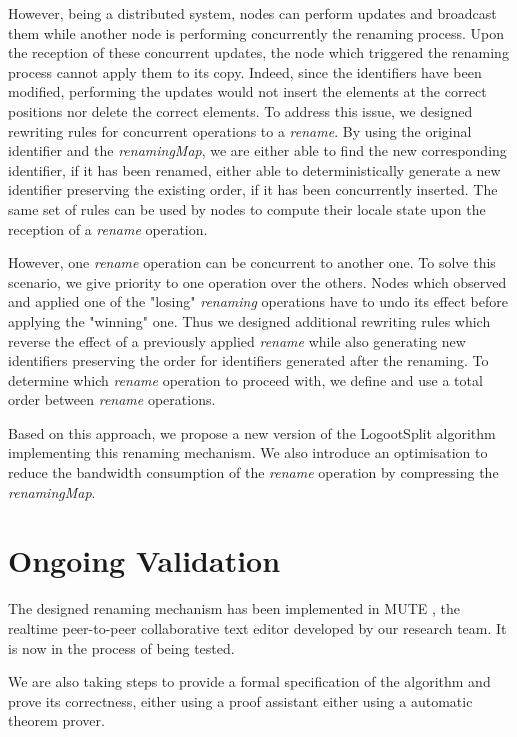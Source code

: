 \documentclass[sigplan]{acmart}
\begin{document}
However, being a distributed system, nodes can perform updates and broadcast them while another node is performing concurrently the renaming process.
Upon the reception of these concurrent updates, the node which triggered the renaming process cannot apply them to its copy.
Indeed, since the identifiers have been modified, performing the updates would not insert the elements at the correct positions nor delete the correct elements.
To address this issue, we designed rewriting rules for concurrent operations to a \emph{rename}.
By using the original identifier and the \emph{renamingMap}, we are either able to find the new corresponding identifier, if it has been renamed, either able to deterministically generate a new identifier preserving the existing order, if it has been concurrently inserted.
The same set of rules can be used by nodes to compute their locale state upon the reception of a \emph{rename} operation.

However, one \emph{rename} operation can be concurrent to another one.
To solve this scenario, we give priority to one operation over the others.
Nodes which observed and applied one of the "losing" \emph{renaming} operations have to undo its effect before applying the "winning" one.
Thus we designed additional rewriting rules which reverse the effect of a previously applied \emph{rename} while also generating new identifiers preserving the order for identifiers generated after the renaming.
To determine which \emph{rename} operation to proceed with, we define and use a total order between \emph{rename} operations.

Based on this approach, we propose a new version of the LogootSplit \cite{AndreCollaborateCom2013} algorithm implementing this renaming mechanism.
We also introduce an optimisation to reduce the bandwidth consumption of the \emph{rename} operation by compressing the \emph{renamingMap}.

\section{Ongoing Validation}

The designed renaming mechanism has been implemented in MUTE \cite{nicolas:hal-01655438}, the realtime peer-to-peer collaborative text editor developed by our research team.
It is now in the process of being tested.

We are also taking steps to provide a formal specification of the algorithm and prove its correctness, either using a proof assistant either using a automatic theorem prover.
\end{document}
